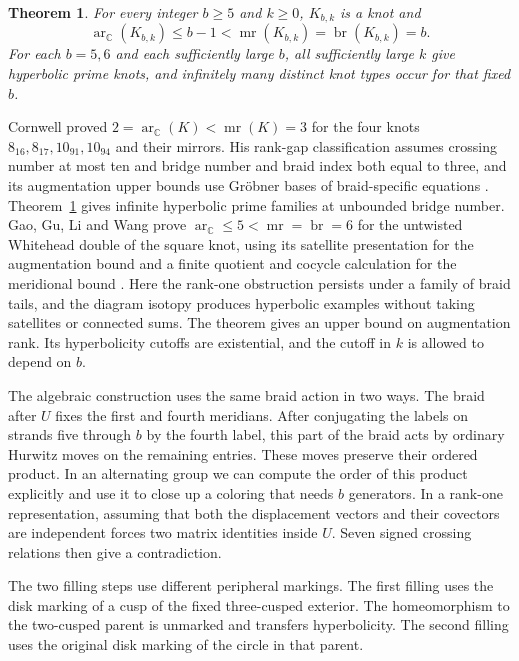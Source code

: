 \documentclass[11pt]{article}
\newtheorem{theorem}{Theorem}
\theoremstyle{remark}
\newcommand{\ar}{\operatorname{ar}_{\mathbb C}}
\newcommand{\mr}{\operatorname{mr}}
\newcommand{\br}{\operatorname{br}}
\begin{document}
\begin{theorem}\label{thm:main}
For every integer \(b\ge5\) and \(k\ge0\), \(K_{b,k}\) is a knot and
\[
              \ar(K_{b,k})\le b-1<\mr(K_{b,k})=\br(K_{b,k})=b.
\]
For each \(b=5,6\) and each sufficiently large \(b\), all sufficiently
large \(k\) give hyperbolic prime knots, and infinitely many distinct
knot types occur for that fixed \(b\).
\end{theorem}

Cornwell proved \(2=\ar(K)<\mr(K)=3\) for the four knots
\(8_{16},8_{17},10_{91},10_{94}\) and their mirrors. His rank-gap
classification assumes crossing number at most ten and bridge number
and braid index both equal to three, and its augmentation upper bounds
use Gröbner bases of braid-specific equations
\cite[Corollary 1.12 and Theorem 5.3]{Cornwell}. Theorem~\ref{thm:main}
gives infinite hyperbolic prime families at unbounded bridge number.
Gao, Gu, Li and Wang prove \(\ar\le5<\mr=\br=6\) for the
untwisted Whitehead double of the square knot, using its satellite
presentation for the augmentation bound and a finite quotient and
cocycle calculation for the meridional bound
\cite[Theorem 1.3 and Section 6]{GGLW}.
Here the rank-one obstruction persists under a family of braid tails,
and the diagram isotopy produces hyperbolic examples without taking
satellites or connected sums. The theorem gives an upper
bound on augmentation rank. Its hyperbolicity cutoffs are existential,
and the cutoff in \(k\) is allowed to depend on \(b\).

The algebraic construction uses the same braid action in two ways.
The braid after \(U\) fixes the first and fourth meridians. After
conjugating the labels on strands five through \(b\) by the fourth
label, this part of the braid acts by ordinary Hurwitz moves on the
remaining entries. These moves preserve their ordered product. In an
alternating group we can compute the order of this product explicitly
and use it to close up a coloring that needs \(b\) generators. In a
rank-one representation, assuming that both the displacement vectors
and their covectors are independent forces two matrix identities inside
\(U\). Seven signed crossing relations then give a contradiction.

The two filling steps use different peripheral markings. The first
filling uses the disk marking of a cusp of the fixed three-cusped
exterior. The homeomorphism to the two-cusped parent is unmarked
and transfers hyperbolicity. The second filling uses the original
disk marking of the circle in that parent.
\end{document}
